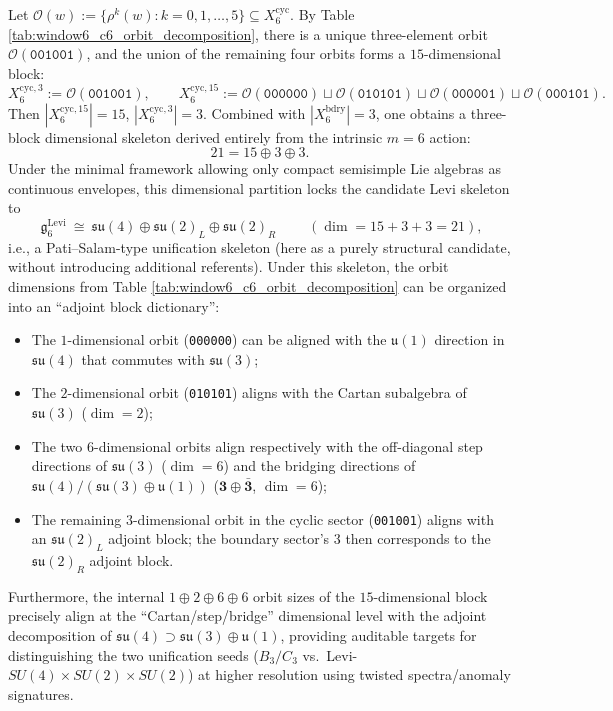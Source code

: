 Let \(\mathcal{O}(w):=\{\rho^k(w):k=0,1,\dots,5\}\subseteq X_6^{\mathrm{cyc}}\).
By Table \ref{tab:window6_c6_orbit_decomposition}, there is a unique three-element orbit \(\mathcal{O}(\texttt{001001})\), and the union of the remaining four orbits forms a \(15\)-dimensional block:
\[
X^{\mathrm{cyc},3}_6:=\mathcal{O}(\texttt{001001}),\qquad
X^{\mathrm{cyc},15}_6:=\mathcal{O}(\texttt{000000})\sqcup \mathcal{O}(\texttt{010101})\sqcup \mathcal{O}(\texttt{000001})\sqcup \mathcal{O}(\texttt{000101}).
\]
Then \(|X^{\mathrm{cyc},15}_6|=15\), \(|X^{\mathrm{cyc},3}_6|=3\).
Combined with \(|X_6^{\mathrm{bdry}}|=3\), one obtains a three-block dimensional skeleton derived entirely from the intrinsic \(m=6\) action:
\[
21=15\oplus 3\oplus 3.
\]
Under the minimal framework allowing only compact semisimple Lie algebras as continuous envelopes, this dimensional partition locks the candidate Levi skeleton to
\[
\boxed{\;\mathfrak g_{6}^{\mathrm{Levi}}\ \cong\ \mathfrak{su}(4)\oplus\mathfrak{su}(2)_L\oplus\mathfrak{su}(2)_R\;}\qquad(\dim=15+3+3=21),
\]
i.e., a Pati--Salam-type unification skeleton (here as a purely structural candidate, without introducing additional referents).
Under this skeleton, the orbit dimensions from Table \ref{tab:window6_c6_orbit_decomposition} can be organized into an ``adjoint block dictionary'':
\begin{itemize}
  \item The \(1\)-dimensional orbit (\texttt{000000}) can be aligned with the \(\mathfrak{u}(1)\) direction in \(\mathfrak{su}(4)\) that commutes with \(\mathfrak{su}(3)\);
  \item The \(2\)-dimensional orbit (\texttt{010101}) aligns with the Cartan subalgebra of \(\mathfrak{su}(3)\) (\(\dim=2\));
  \item The two \(6\)-dimensional orbits align respectively with the off-diagonal step directions of \(\mathfrak{su}(3)\) (\(\dim=6\)) and the bridging directions of
  \(\mathfrak{su}(4)/(\mathfrak{su}(3)\oplus\mathfrak{u}(1))\) (\(\mathbf{3}\oplus\bar{\mathbf{3}}\), \(\dim=6\));
  \item The remaining \(3\)-dimensional orbit in the cyclic sector (\texttt{001001}) aligns with an \(\mathfrak{su}(2)_L\) adjoint block; the boundary sector's \(3\) then corresponds to the \(\mathfrak{su}(2)_R\) adjoint block.
\end{itemize}
Furthermore, the internal \(1\oplus 2\oplus 6\oplus 6\) orbit sizes of the \(15\)-dimensional block precisely align at the ``Cartan/step/bridge'' dimensional level with the adjoint decomposition of
\(
\mathfrak{su}(4)\supset \mathfrak{su}(3)\oplus \mathfrak{u}(1)
\),
providing auditable targets for distinguishing the two unification seeds (\(B_3/C_3\) vs.\ Levi-\(SU(4)\times SU(2)\times SU(2)\)) at higher resolution using twisted spectra/anomaly signatures.

